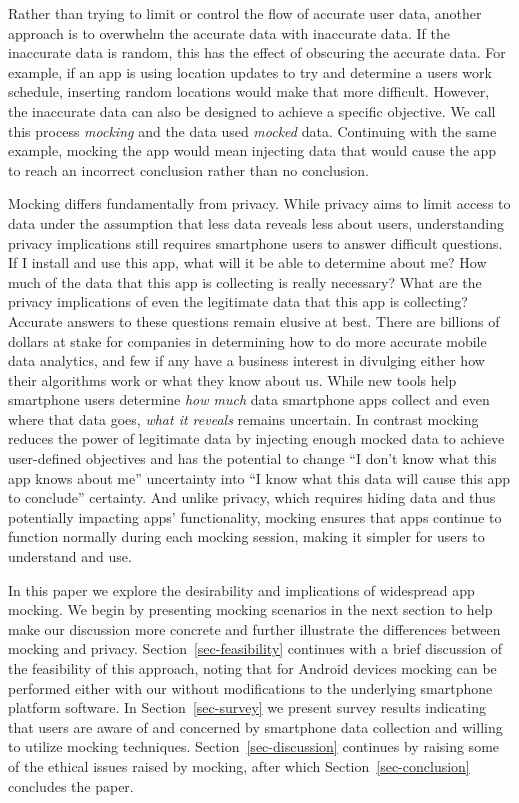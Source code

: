 Rather than trying to limit or control the flow of accurate user data,
another approach is to overwhelm the accurate data with inaccurate data. If
the inaccurate data is random, this has the effect of obscuring the accurate
data. For example, if an app is using location updates to try and determine a
users work schedule, inserting random locations would make that more
difficult. However, the inaccurate data can also be designed to achieve a
specific objective. We call this process \textit{mocking} and the data used
\textit{mocked} data. Continuing with the same example, mocking the app would
mean injecting data that would cause the app to reach an incorrect conclusion
rather than no conclusion.

Mocking differs fundamentally from privacy. While privacy aims to limit
access to data under the assumption that less data reveals less about users,
understanding privacy implications still requires smartphone users to answer
difficult questions. If I install and use this app, what will it be able to
determine about me? How much of the data that this app is collecting is
really necessary? What are the privacy implications of even the legitimate
data that this app is collecting? Accurate answers to these questions remain
elusive at best. There are billions of dollars at stake for companies in
determining how to do more accurate mobile data analytics, and few if any
have a business interest in divulging either how their algorithms work or
what they know about us. While new tools help smartphone users determine
\textit{how much} data smartphone apps collect and even where that data goes,
\textit{what it reveals} remains uncertain. In contrast mocking reduces the
power of legitimate data by injecting enough mocked data to achieve
user-defined objectives and has the potential to change ``I don't know what
this app knows about me'' uncertainty into ``I know what this data will cause
this app to conclude'' certainty. And unlike privacy, which requires hiding
data and thus potentially impacting apps' functionality, mocking ensures that
apps continue to function normally during each mocking session, making it
simpler for users to understand and use.

In this paper we explore the desirability and implications of widespread app
mocking. We begin by presenting mocking scenarios in the next section to help
make our discussion more concrete and further illustrate the differences
between mocking and privacy. Section~\ref{sec-feasibility} continues with a
brief discussion of the feasibility of this approach, noting that for Android
devices mocking can be performed either with our without modifications to the
underlying smartphone platform software. In Section~\ref{sec-survey} we
present survey results indicating that users are aware of and concerned by
smartphone data collection and willing to utilize mocking techniques.
Section~\ref{sec-discussion} continues by raising some of the ethical issues
raised by mocking, after which Section~\ref{sec-conclusion} concludes the
paper.
